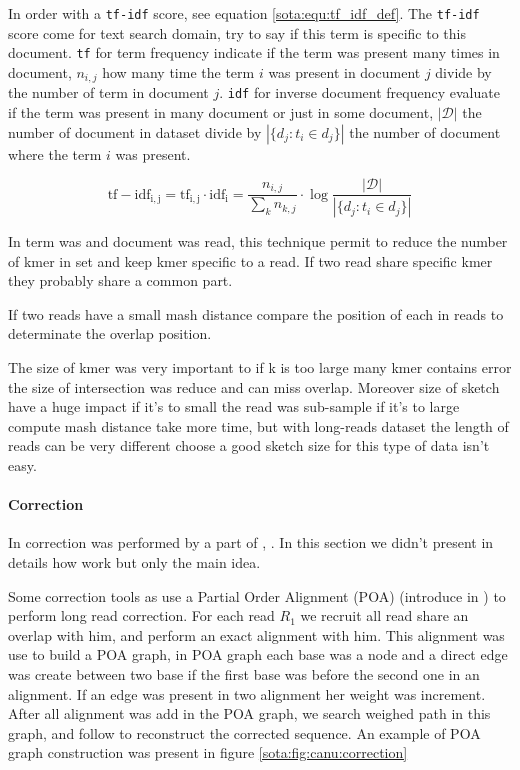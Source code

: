 \documentclass[main]{subfiles}
\begin{document}
In \mhap order \kmer with a \texttt{tf-idf} score, see equation \ref{sota:equ:tf_idf_def}. The \texttt{tf-idf} score come for text search domain, try to say if this term is specific to this document. \texttt{tf} for term frequency indicate if the term was present many times in document, $n_{i,j}$ how many time the term $i$ was present in document $j$ divide by the number of term in document $j$. \texttt{idf} for inverse document frequency evaluate if the term was present in many document or just in some document, $|\mathcal{D}|$ the number of document in dataset divide by $|\{d_{j}:t_{i}\in d_{j}\}|$ the number of document where the term $i$ was present.

\begin{equation}
\mathrm{tf-idf_{i,j}} = \mathrm{tf_{i,j}} \cdot \mathrm{idf_{i}} = \frac{n_{i,j}}{\sum_{k}n_{k,j}} \cdot \log{\frac  {|\mathcal{D}|}{|\{d_{j}:t_{i}\in d_{j}\}|}}
\label{sota:equ:tf_idf_def}
\end{equation}

In \mhap term was \kmer and document was read, this technique permit to reduce the number of kmer in set and keep kmer specific to a read. If two read share specific kmer they probably share a common part.

If two reads have a small mash distance \mhap compare the position of each \kmer in reads to determinate the overlap position.

The size of kmer was very important to if k is too large many kmer contains error the size of intersection was reduce and \mhap can miss overlap. Moreover size of sketch have a huge impact if it's to small the read was sub-sample if it's to large compute mash distance take more time, but with long-reads dataset the length of reads can be very different choose a good sketch size for this type of data isn't easy.

\paragraph{Correction}

In \canu correction was performed by a part of  \cite{falcon}, . In this section we didn't present in details how  work but only the main idea.

Some correction tools as  use a Partial Order Alignment (POA) (introduce in \cite{poa}) to perform long read correction. For each read \texttt{$R_1$} we recruit all read share an overlap with him, and perform an exact alignment with him. This alignment was use to build a POA graph, in POA graph each base was a node and a direct edge was create between two base if the first base was before the second one in an alignment. If an edge was present in two alignment her weight was increment. After all alignment was add in the POA graph, we search weighed path in this graph, and follow to reconstruct the corrected sequence. An example of POA graph construction was present in figure \ref{sota:fig:canu:correction}
\end{document}

